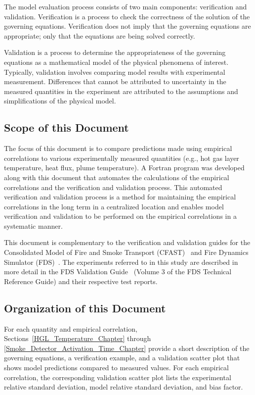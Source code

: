 \documentclass[11pt]{book}
\begin{document}
The model evaluation process consists of two main components: verification and validation. Verification is a process to check the correctness of the solution of the governing equations. Verification does not imply that the governing equations are appropriate; only that the equations are being solved correctly.

Validation is a process to determine the appropriateness of the governing equations as a mathematical model of the physical phenomena of interest. Typically, validation involves comparing model results with experimental measurement. Differences that cannot be attributed to uncertainty in the measured quantities in the experiment are attributed to the assumptions and simplifications of the physical model.

\subsection*{Scope of this Document}

The focus of this document is to compare predictions made using empirical correlations to various experimentally measured quantities (e.g., hot gas layer temperature, heat flux, plume temperature). A Fortran program was developed along with this document that automates the calculations of the empirical correlations and the verification and validation process. This automated verification and validation process is a method for maintaining the empirical correlations in the long term in a centralized location and enables model verification and validation to be performed on the empirical correlations in a systematic manner.

This document is complementary to the verification and validation guides for the Consolidated Model of Fire and Smoke Transport (CFAST)~\cite{CFAST_Tech_Guide_6} and Fire Dynamics Simulator (FDS)~\cite{FDS_Verification_Guide, FDS_Validation_Guide}. The experiments referred to in this study are described in more detail in the FDS Validation Guide~\cite{FDS_Validation_Guide} (Volume 3 of the FDS Technical Reference Guide) and their respective test reports.


\clearpage


\subsection*{Organization of this Document}

For each quantity and empirical correlation, Sections~\ref{HGL_Temperature_Chapter} through \ref{Smoke_Detector_Activation_Time_Chapter} provide a short description of the governing equations, a verification example, and a validation scatter plot that shows model predictions compared to measured values. For each empirical correlation, the corresponding validation scatter plot lists the experimental relative standard deviation, model relative standard deviation, and bias factor.
\end{document}
